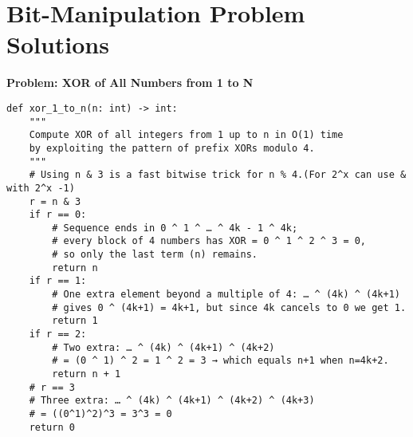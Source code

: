 % 
% 
\section*{Bit-Manipulation Problem Solutions}

    \noindent\textbf{Problem: XOR of All Numbers from 1 to N}
    \begin{verbatim}
def xor_1_to_n(n: int) -> int:
    """
    Compute XOR of all integers from 1 up to n in O(1) time
    by exploiting the pattern of prefix XORs modulo 4.
    """
    # Using n & 3 is a fast bitwise trick for n % 4.(For 2^x can use & with 2^x -1)
    r = n & 3
    if r == 0:
        # Sequence ends in 0 ^ 1 ^ … ^ 4k - 1 ^ 4k;
        # every block of 4 numbers has XOR = 0 ^ 1 ^ 2 ^ 3 = 0,
        # so only the last term (n) remains.
        return n
    if r == 1:
        # One extra element beyond a multiple of 4: … ^ (4k) ^ (4k+1)
        # gives 0 ^ (4k+1) = 4k+1, but since 4k cancels to 0 we get 1.
        return 1
    if r == 2:
        # Two extra: … ^ (4k) ^ (4k+1) ^ (4k+2)
        # = (0 ^ 1) ^ 2 = 1 ^ 2 = 3 → which equals n+1 when n=4k+2.
        return n + 1
    # r == 3
    # Three extra: … ^ (4k) ^ (4k+1) ^ (4k+2) ^ (4k+3)
    # = ((0^1)^2)^3 = 3^3 = 0
    return 0

    \end{verbatim}

